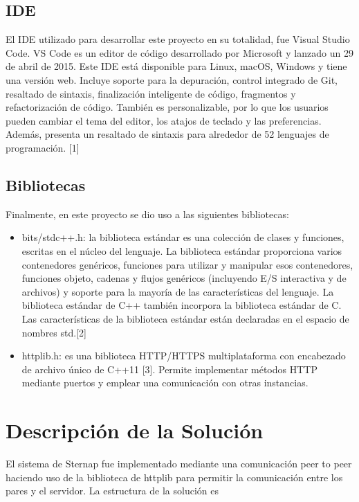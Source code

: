 \documentclass{article}
\begin{document}
\subsection{IDE}
El IDE utilizado para desarrollar este proyecto en su totalidad, fue Visual Studio Code. VS Code es un editor de código desarrollado por Microsoft y lanzado un 29 de abril de 2015. Este IDE está disponible para Linux, macOS, Windows y tiene una versión web. Incluye soporte para la depuración, control integrado de Git, resaltado de sintaxis, finalización inteligente de código, fragmentos y refactorización de código. También es personalizable, por lo que los usuarios pueden cambiar el tema del editor, los atajos de teclado y las preferencias. Además, presenta un resaltado de sintaxis para alrededor de 52 lenguajes de programación. [1]

\subsection{Bibliotecas}
Finalmente, en este proyecto se dio uso a las siguientes bibliotecas:

\begin{itemize}
    \item bits/stdc++.h:  la biblioteca estándar es una colección de clases y funciones, escritas en el núcleo del lenguaje. La biblioteca estándar proporciona varios contenedores genéricos, funciones para utilizar y manipular esos contenedores, funciones objeto, cadenas y flujos genéricos (incluyendo E/S interactiva y de archivos) y soporte para la mayoría de las características del lenguaje. La biblioteca estándar de C++ también incorpora la biblioteca estándar de C. Las características de la biblioteca estándar están declaradas en el espacio de nombres std.[2]
    \item httplib.h: es una biblioteca HTTP/HTTPS multiplataforma con encabezado de archivo único de C++11 [3]. Permite implementar métodos HTTP mediante puertos y emplear una comunicación con otras instancias.
\end{itemize}

\section{Descripción de la Solución}
El sistema de Sternap fue implementado mediante una comunicación peer to peer haciendo uso de la biblioteca de httplib para permitir la comunicación entre los pares y el servidor. La estructura de la soluci\'on es 
\end{document}
